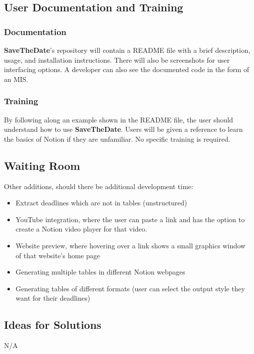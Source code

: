 \documentclass[12pt, titlepage]{article}
\begin{document}
\subsection{User Documentation and Training}

\subsubsection{Documentation}
\textbf{SaveTheDate}’s repository will contain a README file with a brief description, usage, and installation instructions. There will also be screenshots for user interfacing options. A developer can also see the documented code in the form of an MIS.

\subsubsection{Training}
By following along an example shown in the README file, the user should understand how to use \textbf{SaveTheDate}. Users will be given a reference to learn the basics of Notion if they are unfamiliar. No specific training is required.

\subsection{Waiting Room}
Other additions, should there be additional development time:
\begin{itemize}
  \item Extract deadlines which are not in tables (unstructured)
  \item YouTube integration, where the user can paste a link and has the option to create a Notion video player for that video.
  \item Website preview, where hovering over a link shows a small graphics window of that website’s home page
  \item Generating multiple tables in different Notion webpages
  \item Generating tables of different formats (user can select the output style they want for their deadlines)
\end{itemize}

\subsection{Ideas for Solutions}
N/A




\end{document}
